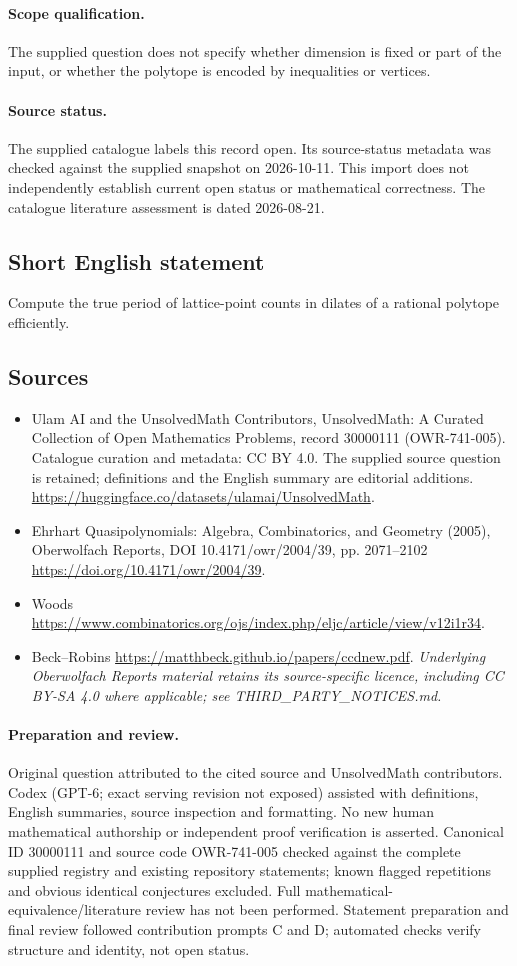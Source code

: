 \documentclass[11pt]{article}
\begin{document}
\paragraph{Scope qualification.}
The supplied question does not specify whether dimension is fixed or part of the input, or whether the polytope is encoded by inequalities or vertices.
\paragraph{Source status.}
The supplied catalogue labels this record open. Its source-status metadata was checked against the supplied snapshot on 2026-10-11. This import does not independently establish current open status or mathematical correctness. The catalogue literature assessment is dated 2026-08-21.
\subsection{Short English statement}
Compute the true period of lattice-point counts in dilates of a rational polytope efficiently.
\subsection{Sources}
\begin{itemize}
\item[S1] Ulam AI and the UnsolvedMath Contributors, UnsolvedMath: A Curated Collection of Open Mathematics Problems, record 30000111 (OWR-741-005). Catalogue curation and metadata: CC BY 4.0. The supplied source question is retained; definitions and the English summary are editorial additions.
\url{https://huggingface.co/datasets/ulamai/UnsolvedMath}.
\item[S2] Ehrhart Quasipolynomials: Algebra, Combinatorics, and Geometry (2005), Oberwolfach Reports, DOI 10.4171/owr/2004/39, pp. 2071--2102
\url{https://doi.org/10.4171/owr/2004/39}.
\item[S3] Woods
\url{https://www.combinatorics.org/ojs/index.php/eljc/article/view/v12i1r34}.
\item[S4] Beck--Robins
\url{https://matthbeck.github.io/papers/ccdnew.pdf}.
\textit{Underlying Oberwolfach Reports material retains its source-specific licence, including CC BY-SA 4.0 where applicable; see THIRD\_PARTY\_NOTICES.md.}
\end{itemize}
\paragraph{Preparation and review.}
Original question attributed to the cited source and UnsolvedMath contributors. Codex (GPT-6; exact serving revision not exposed) assisted with definitions, English summaries, source inspection and formatting. No new human mathematical authorship or independent proof verification is asserted. Canonical ID 30000111 and source code OWR-741-005 checked against the complete supplied registry and existing repository statements; known flagged repetitions and obvious identical conjectures excluded. Full mathematical-equivalence/literature review has not been performed. Statement preparation and final review followed contribution prompts C and D; automated checks verify structure and identity, not open status.
\label{end:30000111}
\end{document}
